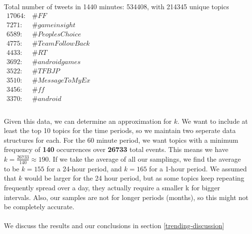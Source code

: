 Total number of tweets in 1440 minutes: 534408, with 214345 unique topics\\

$\begin{array}{ll}
    17064: & \#FF \\
    7271: & \#gameinsight \\
    6589: & \#PeoplesChoice \\
    4775: & \#TeamFollowBack \\
    4433: & \#RT \\
    3692: & \#androidgames \\
    3522: & \#TFBJP \\
    3510: & \#MessageToMyEx \\
    3456: & \#ff \\
    3370: & \#android \\
\end{array}$
\\
\\
Given this data, we can determine an approximation for $k$. We want to include at least the top 10 topics for the time periods, so we maintain two seperate data structures for each. For the 60 minute period, we want topics with a minimum frequency of \textbf{140} occurrences over \textbf{26733} total events. This means we have $k = \frac{26733}{140} \approx 190$. If we take the average of all our samplings, we find the average to be $k = 155$ for a 24-hour period, and $k = 165$ for a 1-hour period. We assumed that $k$ would be larger for the 24 hour period, but as some topics keep repeating frequently spread over a day, they actually require a smaller k for bigger intervals. Also, our samples are not for longer periods (months), so this might not be completely accurate.
\\
\\
We discuss the results and our conclusions in section \ref{trending-discussion}
